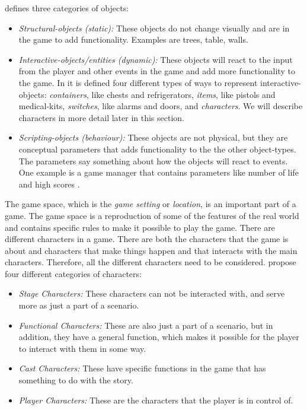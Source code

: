 \cite{beram} defines three categories of objects:
\begin{itemize}
\item \emph{Structural-objects (static):} These objects do not change visually and are in the game to add functionality. Examples are trees, table, walls.
\item \emph{Interactive-objects/entities (dynamic):} These objects will react to the input from the player and other events in the game and add more functionality to the game. In \cite{beram} it is defined four different types of ways to represent interactive-objects: \emph{containers}, like chests and refrigerators, \emph{items}, like pistols and medical-kits, \emph{switches}, like alarms and doors, and \emph{characters}. We will describe characters in more detail later in this section. 
\item \emph{Scripting-objects (behaviour):} These objects are not physical, but they are conceptual parameters that adds functionality to the the other object-types. The parameters say something about how the objects will react to events. One example is a game manager that contains parameters like number of life and high scores \cite{umlapproach}. 
\end{itemize}

The game space, which is the \emph{game setting} or \emph{location}, is an important part of a game. The game space is a reproduction of some of the features of the real world and contains specific rules to make it possible to play the game. There are different characters in a game. There are both the characters that the game is about and characters that make things happen and that interacts with the main characters. Therefore, all the different characters need to be considered. \cite{understandingvg} propose four different categories of characters: 

\begin{itemize}
\item \emph{Stage Characters:} These characters can not be interacted with, and serve more as just a part of a scenario. \\
\item \emph{Functional Characters:} These are also just a part of a scenario, but in addition, they have a general function, which makes it possible for the player to interact with them in some way. \\
\item \emph{Cast Characters:} These have specific functions in the game that has something to do with the story. \\
\item \emph{Player Characters:} These are the characters that the player is in control of. 
\end{itemize}

